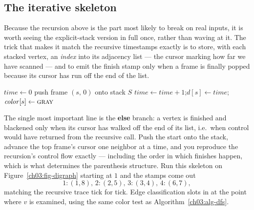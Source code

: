 \subsection{The iterative skeleton}
\label{ch03:iterative}

Because the recursion above is the part most likely to break on real inputs, it is worth seeing the explicit-stack version in full once, rather than waving at it. The trick that makes it match the recursive timestamps exactly is to store, with each stacked vertex, an \emph{index} into its adjacency list --- the cursor marking how far we have scanned --- and to emit the finish stamp only when a frame is finally popped because its cursor has run off the end of the list.

\begin{algorithm}[H]
\DontPrintSemicolon
{}
\BlankLine
$\mathit{time}\gets 0$\;
push frame $(s,\,0)$ onto stack $S$\;
$\mathit{time}\gets\mathit{time}+1$;\quad $d[s]\gets\mathit{time}$;\quad $\mathit{color}[s]\gets\textsc{gray}$\;
\caption{Iterative DFS with a per-frame adjacency cursor}
\label{ch03:alg-iterative}
\end{algorithm}

The single most important line is the \textbf{else} branch: a vertex is finished and blackened only when its cursor has walked off the end of its list, i.e.\ when control would have returned from the recursive call. Push the start onto the stack, advance the top frame's cursor one neighbor at a time, and you reproduce the recursion's control flow exactly --- including the order in which finishes happen, which is what determines the parenthesis structure. Run this skeleton on Figure~\ref{ch03:fig-digraph} starting at $1$ and the stamps come out
\[
  1{:}(1,8),\,2{:}(2,5),\,3{:}(3,4),\,4{:}(6,7),
\]
matching the recursive trace tick for tick. Edge classification slots in at the point where $v$ is examined, using the same color test as Algorithm~\ref{ch03:alg-dfs}.

